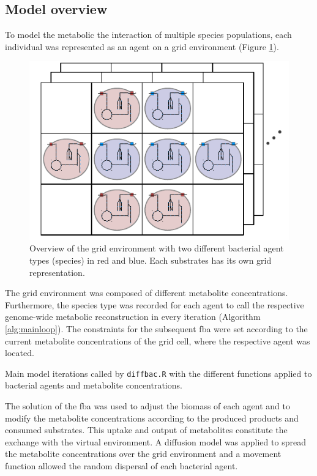 \subsection{Model overview}
To model the metabolic the interaction of multiple species populations, each individual was represented as an agent on a grid environment (Figure \hyperref[fig:bacarena]{\ref{fig:bacarena}}).
\begin{figure}[h!]\centering
\includegraphics[scale=1.4]{method_chart_BacArena.pdf}
\caption[Overview BacArena]{Overview of the grid environment with two different bacterial agent types (species) in red and blue. Each substrates has its own grid representation.}
\label{fig:bacarena}
\end{figure}
The grid environment was composed of different metabolite concentrations.
Furthermore, the species type was recorded for each agent to call the respective genome-wide metabolic reconstruction in every iteration (Algorithm \hyperref[alg:mainloop]{\ref{alg:mainloop}}). The constraints for the subsequent fba were set according to the current metabolite concentrations of the grid cell, where the respective agent was located.
\begin{algorithm}
\caption{Main model iterations called by \texttt{diffbac.R} with the different functions applied to bacterial agents and metabolite concentrations.}
\SetAlgoLined
{}
\label{alg:mainloop}
\end{algorithm}
The solution of the fba was used to adjust the biomass of each agent and to modify the metabolite concentrations according to the produced products and consumed substrates. 
This uptake and output of metabolites constitute the exchange with the virtual environment.
A diffusion model was applied to spread the metabolite concentrations over the grid environment and a movement function allowed the random dispersal of each bacterial agent.

